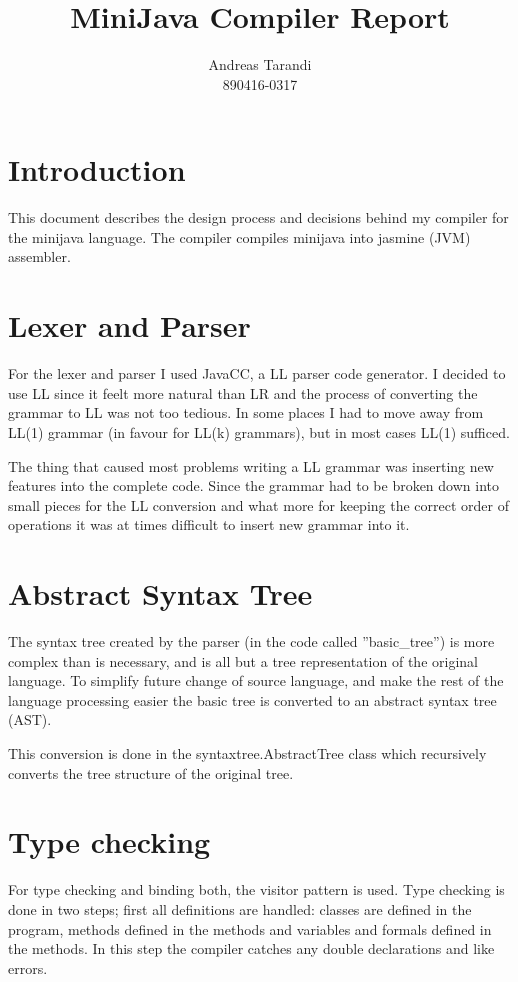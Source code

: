 \documentclass[a4paper,11pt]{article}
\author{Andreas Tarandi\\890416-0317}
\title{MiniJava Compiler Report}
\begin{document}
  \maketitle

  \section{Introduction}
  This document describes the design process and decisions behind my compiler for the minijava language. The compiler compiles minijava into jasmine (JVM) assembler.

  \section{Lexer and Parser}
  For the lexer and parser I used JavaCC, a LL parser code generator. I decided to use LL since it feelt more natural than LR and the
  process of converting the grammar to LL was not too tedious. In some places I had to move away from LL(1) grammar (in favour for LL(k) grammars), but in most cases LL(1) sufficed.

  The thing that caused most problems writing a LL grammar was inserting new features into the complete code. Since the grammar had to be broken down into small pieces for
  the LL conversion and what more for keeping the correct order of operations it was at times difficult to insert new grammar into it.

  \section{Abstract Syntax Tree}
  The syntax tree created by the parser (in the code called ''basic\_tree'') is more complex than
  is necessary, and is all but a tree representation of the original language. To simplify future change of source language, and make the rest of the language processing easier the basic tree is
  converted to an abstract syntax tree (AST).

  This conversion is done in the syntaxtree.AbstractTree class which recursively converts the tree structure of the original tree.

  \section{Type checking}

  For type checking and binding both, the visitor pattern is used. Type checking is done in two steps; first all definitions are handled:
  classes are defined in the program, methods defined in the methods and variables and formals defined in the methods. In this step the compiler catches any
  double declarations and like errors.
\end{document}
